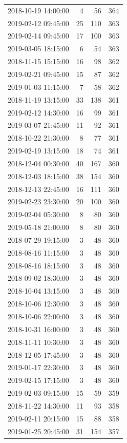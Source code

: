 \begin{tabular}{lrrr}
2018-10-19 14:00:00 & 4 & 56 & 364 \\
2019-02-12 09:45:00 & 25 & 110 & 363 \\
2019-02-14 09:45:00 & 17 & 100 & 363 \\
2019-03-05 18:15:00 & 6 & 54 & 363 \\
2018-11-15 15:15:00 & 16 & 98 & 362 \\
2019-02-21 09:45:00 & 15 & 87 & 362 \\
2019-01-03 11:15:00 & 7 & 58 & 362 \\
2018-11-19 13:15:00 & 33 & 138 & 361 \\
2019-02-12 14:30:00 & 16 & 99 & 361 \\
2019-03-07 21:45:00 & 11 & 92 & 361 \\
2018-10-22 21:30:00 & 8 & 77 & 361 \\
2019-02-19 13:15:00 & 18 & 74 & 361 \\
2018-12-04 00:30:00 & 40 & 167 & 360 \\
2018-12-03 18:15:00 & 38 & 154 & 360 \\
2018-12-13 22:45:00 & 16 & 111 & 360 \\
2019-02-23 23:30:00 & 20 & 100 & 360 \\
2019-02-04 05:30:00 & 8 & 80 & 360 \\
2019-05-18 21:00:00 & 8 & 80 & 360 \\
2018-07-29 19:15:00 & 3 & 48 & 360 \\
2018-08-16 11:15:00 & 3 & 48 & 360 \\
2018-08-16 18:15:00 & 3 & 48 & 360 \\
2018-09-02 18:30:00 & 3 & 48 & 360 \\
2018-10-04 13:15:00 & 3 & 48 & 360 \\
2018-10-06 12:30:00 & 3 & 48 & 360 \\
2018-10-06 22:00:00 & 3 & 48 & 360 \\
2018-10-31 16:00:00 & 3 & 48 & 360 \\
2018-11-11 10:30:00 & 3 & 48 & 360 \\
2018-12-05 17:45:00 & 3 & 48 & 360 \\
2019-01-17 22:30:00 & 3 & 48 & 360 \\
2019-02-15 17:15:00 & 3 & 48 & 360 \\
2019-02-03 09:15:00 & 15 & 59 & 359 \\
2018-11-22 14:30:00 & 11 & 93 & 358 \\
2019-02-11 20:15:00 & 15 & 88 & 358 \\
2019-01-25 20:45:00 & 31 & 154 & 357 \\

\end{tabular}
